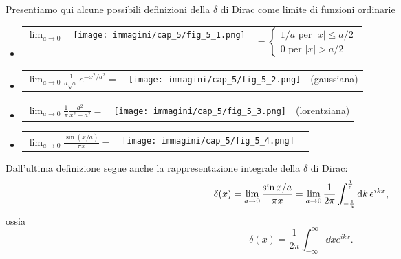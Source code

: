 \documentclass[a4paper,12pt,oneside]{book}
\begin{document}
Presentiamo qui alcune possibili definizioni della $\delta$ di Dirac come limite di funzioni ordinarie
\begin{itemize}
\item
\begin{tabular}{ >{\centering\arraybackslash} m{1.5cm} >{\centering\arraybackslash} m{3.5cm} >{\centering\arraybackslash} m{4.5cm}}
$\displaystyle{\lim _{a \rightarrow 0}}$ & \texttt{[image: immagini/cap\_5/fig\_5\_1.png]}  & $=\displaystyle{\begin{cases}
1/a \textrm{ per } \vert x \vert \leq a/2\\
0 \textrm{ per } \vert x \vert > a/2
\end{cases}}$
\end{tabular}
\item
\begin{tabular}{ >{\centering\arraybackslash} m{4cm} >{\centering\arraybackslash} m{3.5cm} >{\centering\arraybackslash} m{2cm}}
$\displaystyle{\lim _{a \rightarrow 0}\frac{1}{a\sqrt{\pi}}e^{-x^2/a^2}=}$ & \texttt{[image: immagini/cap\_5/fig\_5\_2.png]}  & (gaussiana)
\end{tabular}
\item 
\begin{tabular}{ >{\centering\arraybackslash} m{4cm} >{\centering\arraybackslash} m{3.5cm} >{\centering\arraybackslash} m{2cm}}
$\displaystyle{\lim _{a \rightarrow 0}\frac{1}{\pi}\frac{a^2}{x^2+a^2}}=$ & \texttt{[image: immagini/cap\_5/fig\_5\_3.png]}  & (lorentziana)
\end{tabular}
\item 
\begin{tabular}{ >{\centering\arraybackslash} m{4cm} >{\centering\arraybackslash} m{3.5cm} >{\centering\arraybackslash} m{2cm}}
$\displaystyle{\lim _{a \rightarrow 0}\frac{\sin(x/a)}{\pi x}}=$ & \texttt{[image: immagini/cap\_5/fig\_5\_4.png]}  & 
\end{tabular}
\end{itemize}
Dall'ultima definizione segue anche la rappresentazione integrale della $\delta$ di Dirac:
\begin{equation}
  \delta\qty(x) = \lim_{a\to0}\frac{\sin{x/a}}{\pi x}=\lim_{a\to0}\frac{1}{2\pi}\int_{-\frac{1}{a}}^{\frac{1}{a}}\dd{k}e^{ikx} ,
\end{equation}
ossia
\begin{equation}
  \delta(x)=\frac{1}{2\pi}\int_{-\infty}^{\infty}\dd{x}e^{ikx} .
\end{equation}
\end{document}
